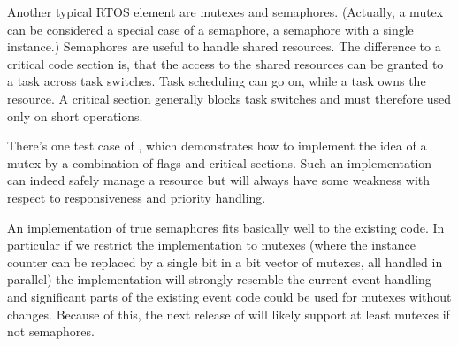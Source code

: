 Another typical RTOS element are mutexes and semaphores. (Actually, a
mutex can be considered a special case of a semaphore, a semaphore with a
single instance.) Semaphores are useful to handle shared resources. The
difference to a critical code section is, that the access to the shared
resources can be granted to a task across task switches. Task scheduling can
go on, while a task owns the resource. A critical section generally blocks
task switches and must therefore used only on short operations. 

There's one test case of \rtos{}, which demonstrates how to implement the
idea of a mutex by a combination of flags and critical sections. Such an
implementation can indeed safely manage a resource but will always have
some weakness with respect to responsiveness and priority handling.

An implementation of true semaphores fits basically well to the existing
code. In particular if we restrict the implementation to mutexes (where
the instance counter can be replaced by a single bit in a bit vector of
 mutexes, all handled in parallel) the implementation will
strongly resemble the current event handling and significant parts of the
existing event code could be used for mutexes without changes. Because of
this, the next release of \rtos{} will likely support at least mutexes if
not semaphores.
